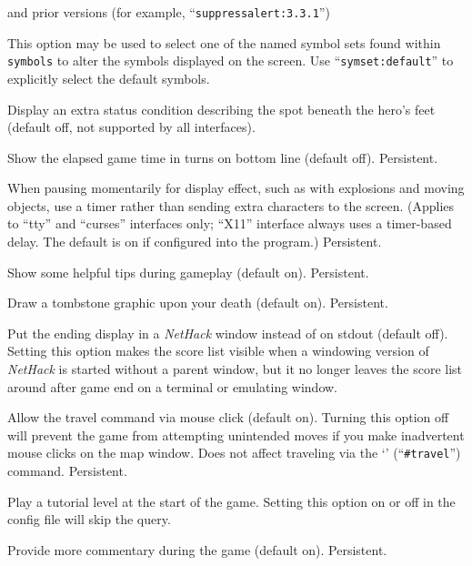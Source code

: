 \documentclass[titlepage]{article}
\begin{document}
\begin{description}[font=\mdseries\itshape]
and prior versions (for example, ``\texttt{suppress\textunderscore alert:3.3.1}'')
\item[symset]
This option may be used to select one of the named symbol sets found within
\texttt{symbols} to alter the symbols displayed on the screen.
Use ``\texttt{symset:default}'' to explicitly select the default symbols.
\item[terrainstatus]
Display an extra status condition describing the spot beneath the hero's
feet (default off, not supported by all interfaces).
\item[time]
Show the elapsed game time in turns on bottom line (default off).  Persistent.
\item[timed\textunderscore delay]
When pausing momentarily for display effect, such as with explosions and
moving objects, use a timer rather than sending extra characters to the
screen.  (Applies to ``tty'' and ``curses'' interfaces only; ``X11'' interface always
uses a timer-based delay.  The default is on if configured into the
program.)  Persistent.
\item[tips]
Show some helpful tips during gameplay (default on).  Persistent.
\item[tombstone]
Draw a tombstone graphic upon your death (default on).  Persistent.
\item[toptenwin]
Put the ending display in a \textit{NetHack} window instead of on stdout (default off).
Setting this option makes the score list visible when a windowing version
of \textit{NetHack} is started without a parent window, but it no longer leaves
the score list around after game end on a terminal or emulating window.
\item[travel]
Allow the travel command via mouse click (default on).
Turning this option off will prevent the game from attempting unintended
moves if you make inadvertent mouse clicks on the map window.
Does not affect traveling via the `\texttt{\textunderscore}' (``\texttt{\#travel}'')
command.  Persistent.
\item[tutorial]
Play a tutorial level at the start of the game.
Setting this option on or off in the config file will skip the query.
\item[verbose]
Provide more commentary during the game (default on).  Persistent.
\item[versinfo]

\end{description}
\end{document}
